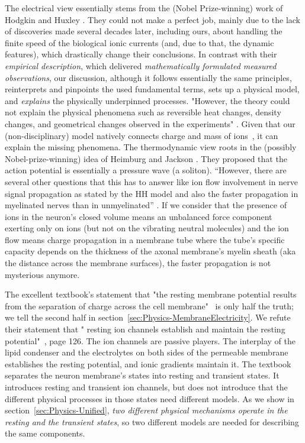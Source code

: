 The electrical view essentially stems from the (Nobel Prize-winning) work of Hodgkin and Huxley \cite{HodgkinHuxley:1952}. They could not make a perfect job, mainly due to the lack of
discoveries made several decades later, including ours, about handling
the finite speed of the biological ionic currents (and, due to that, the dynamic features), which drastically change
their conclusions. In contrast with their \textit{empirical description}, which delivered \textit{mathematically formulated measured observations}, our discussion, although it follows essentially
the same principles, reinterprets and pinpoints the used fundamental terms, sets up a physical model, and \textit{explains} the physically underpinned processes. "However, the theory could not explain the physical
phenomena such as reversible heat changes, density changes,
and geometrical changes observed in the experiments" \cite{ComparisonHHandSoliton:2010}. Given that
our (non-disciplinary) model natively connects charge and mass of ions~\cite{VeghNon-ordinaryLaws:2025}, it can explain the missing phenomena.
The thermodynamic view roots in the (possibly Nobel-prize-winning)
idea of Heimburg and Jackson \cite{SolitonPropagation:2005}. They proposed that the action potential is essentially a pressure wave (a soliton). ``However, there are several other questions that this has to answer like ion flow involvement in nerve signal propagation as stated by the \gls{HH} model and also the faster propagation in myelinated nerves than in unmyelinated'' \cite{ComparisonHHandSoliton:2010}.
If we consider that the presence of ions in the neuron's closed volume means an unbalanced force component exerting only on ions (but not on the vibrating neutral molecules)
and the ion flow means charge propagation in a membrane tube where the tube's specific capacity depends on the thickness of the axonal membrane's myelin sheath (aka the distance across the membrane surfaces), the faster propagation is not mysterious anymore.


The excellent textbook's statement that "the resting membrane potential results
from the separation of charge across the
cell membrane"~\cite{PrinciplesNeuralScience:2013} is only half the truth; we tell the second half in section~\ref{sec:Physics-MembraneElectricity}. 
We refute their statement that "%
resting ion channels
establish and maintain the resting potential"~\cite{PrinciplesNeuralScience:2013}, page 126.
The ion channels are passive players. The interplay of 
the lipid condenser and the electrolytes on both sides
of the permeable membrane establishes the resting potential, and ionic gradients maintain it.
The textbook separates the neuron membrane's states into resting and transient states. 
It introduces resting and transient ion channels,
but does not introduce that the different physical processes in those states need different models. 
As we show in section~\ref{sec:Physics-Unified}, \textit{two different physical mechanisms
operate in the resting and the transient states}, so two different models are needed for describing the same components.

